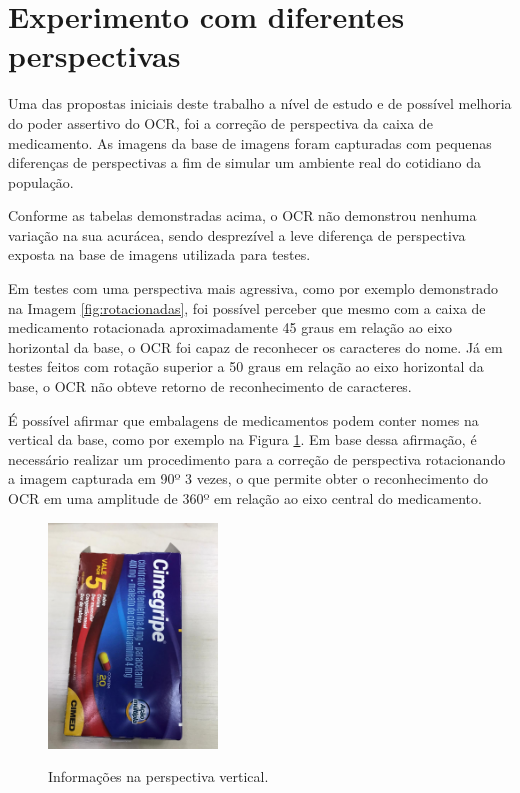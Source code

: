 \section{Experimento com diferentes perspectivas}
Uma das propostas iniciais deste trabalho a nível de estudo e de possível melhoria do poder assertivo do OCR, foi a correção de perspectiva da caixa de medicamento. As imagens da base de imagens foram capturadas com pequenas diferenças de perspectivas a fim de simular um ambiente real do cotidiano da população. 

Conforme as tabelas demonstradas acima, o OCR não demonstrou nenhuma variação na sua acurácea, sendo desprezível a leve diferença de perspectiva exposta na base de imagens utilizada para testes.

Em testes com uma perspectiva mais agressiva, como por exemplo demonstrado na Imagem \ref{fig:rotacionadas}, foi possível perceber que mesmo com a caixa de medicamento rotacionada aproximadamente 45 graus em relação ao eixo horizontal da base, o OCR foi capaz de reconhecer os caracteres do nome. Já em testes feitos com rotação superior a 50 graus em relação ao eixo horizontal da base, o OCR não obteve retorno de reconhecimento de caracteres. 

É possível afirmar que embalagens de medicamentos podem conter nomes na vertical da base, como por exemplo na Figura \ref{fig:vertical}. Em base dessa afirmação, é necessário realizar um procedimento para a correção de perspectiva rotacionando a imagem capturada em 90º 3 vezes, o que permite obter o reconhecimento do OCR em uma amplitude de 360º em relação ao eixo central do medicamento.

 \begin{figure}[h!]
	\centering
	\includegraphics[width=0.4\textwidth]{Imagens/vertical.jpeg} %
	\caption[Informações na perspectiva vertical.]{Informações na perspectiva vertical.}
	\label{fig:vertical}
\end{figure}




